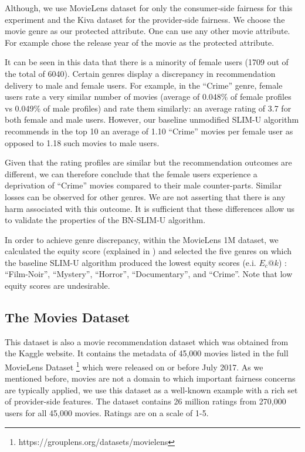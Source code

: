         Although, we use MovieLens dataset for only the consumer-side fairness for this experiment and the Kiva dataset for the provider-side fairness. We choose the movie genre as our protected attribute. One can use any other movie attribute. For example \cite{kamishima2018recommendation} chose the release year of the movie as the protected attribute.
        
        It can be seen in this data that there is a minority of female users (1709 out of the total of 6040). Certain genres display a discrepancy in recommendation delivery to male and female users. For example, in the ``Crime'' genre, female users rate a very similar number of movies (average of 0.048\% of female profiles vs 0.049\% of male profiles) and rate them similarly: an average rating of 3.7 for both female and male users. However, our baseline unmodified SLIM-U algorithm recommends in the top 10 an average of 1.10 ``Crime'' movies per female user as opposed to 1.18 such movies to male users. 
        
        Given that the rating profiles are similar but the recommendation outcomes are different, we can therefore conclude that the female users experience a deprivation of ``Crime'' movies compared to their male counter-parts. Similar losses can be observed for other genres. We are not asserting that there is any harm associated with this outcome. It is sufficient that these differences allow us to validate the properties of the BN-SLIM-U algorithm.
        
        In order to achieve genre discrepancy, within the MovieLens 1M dataset, we calculated the equity score (explained in ) and selected the five genres on which the baseline SLIM-U algorithm produced the lowest equity scores (e.i. $E_c@k$) : ``Film-Noir'', ``Mystery'', ``Horror'', ``Documentary'', and ``Crime''. Note that low equity scores are undesirable.
        



    \subsection{The Movies Dataset}
    
    This dataset is also a movie recommendation dataset which was obtained from the Kaggle website. It contains the metadata of 45,000 movies listed in the full MovieLens Dataset \footnote{https://grouplens.org/datasets/movielens} which were released on or before July 2017. As we mentioned before, movies are not a domain to which important fairness concerns are typically applied, we use this dataset as a well-known example with a rich set of provider-side features. The dataset contains 26 million ratings from 270,000 users for all 45,000 movies. Ratings are on a scale of 1-5.
    
